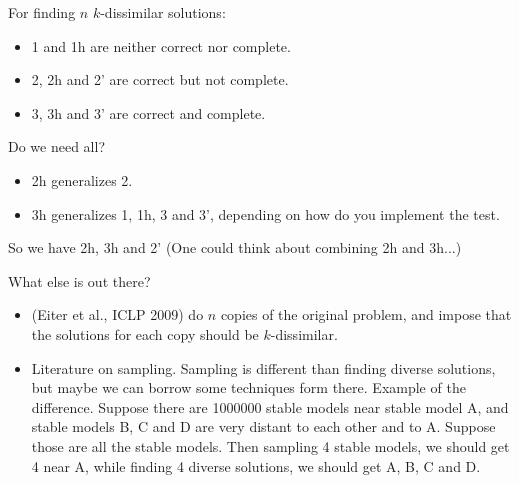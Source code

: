 \documentclass[a4paper,10pt]{article}
\begin{document}
For finding $n$ $k$-dissimilar solutions:
\begin{itemize}
\item
1 and 1h are neither correct nor complete.
\item
2, 2h and 2' are correct but not complete.
\item
3, 3h and 3' are correct and complete.
\end{itemize}

Do we need all?
\begin{itemize}
\item
2h generalizes 2.
\item
3h generalizes 1, 1h, 3 and 3', depending on how do you implement the test.
\end{itemize}
So we have 2h, 3h and 2' (One could think about combining 2h and 3h...)

What else is out there?
\begin{itemize}
\item
(Eiter et al., ICLP 2009) do $n$ copies of the original problem,
and impose that the solutions for each copy should be $k$-dissimilar.
\item
Literature on sampling. 
Sampling is different than finding diverse solutions, 
but maybe we can borrow some techniques form there.
Example of the difference. 
Suppose there are 1000000 stable models near stable model A, and stable models B, C and D are very distant to each other and to A. 
Suppose those are all the stable models.
Then sampling 4 stable models, we should get 4 near A, while finding 4 diverse solutions, we should get A, B, C and D.
\end{itemize}
\end{document}
